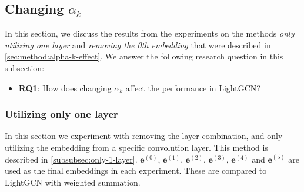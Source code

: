 \subsection{Changing $\alpha_k$}
In this section, we discuss the results from the experiments on the methods \textit{only utilizing one layer} and \textit{removing the 0th embedding} that were described in \autoref{sec:method:alpha-k-effect}.
We answer the following research question in this subsection:
\begin{itemize}
    \item \textbf{RQ1}: How does changing $\alpha_k$ affect the performance in LightGCN?
\end{itemize}

\subsubsection{Utilizing only one layer}
In this section we experiment with removing the layer combination, and only utilizing the embedding from a specific convolution layer.
This method is described in \autoref{subsubsec:only-1-layer}.
$\mathbf{e}^{(0)}$, $\mathbf{e}^{(1)}$, $\mathbf{e}^{(2)}$, $\mathbf{e}^{(3)}$, $\mathbf{e}^{(4)}$ and $\mathbf{e}^{(5)}$ are used as the final embeddings in each experiment.
These are compared to LightGCN with weighted summation.
